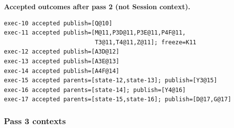 \documentclass[11pt]{article}
\begin{document}
\newpage
\noindent\textbf{Accepted outcomes after pass 2 (not Session context).}
\begin{lstlisting}[style=playbook,basicstyle=\ttfamily\scriptsize]
exec-10 accepted publish=[Q@10]
exec-11 accepted publish=[M@11,P3D@11,P3E@11,P4F@11,
                          T3@11,T4@11,Z@11]; freeze=K11
exec-12 accepted publish=[A3D@12]
exec-13 accepted publish=[A3E@13]
exec-14 accepted publish=[A4F@14]
exec-15 accepted parents=[state-12,state-13]; publish=[Y3@15]
exec-16 accepted parents=[state-14]; publish=[Y4@16]
exec-17 accepted parents=[state-15,state-16]; publish=[D@17,G@17]
\end{lstlisting}

\subsubsection{Pass 3 contexts}
\end{document}
